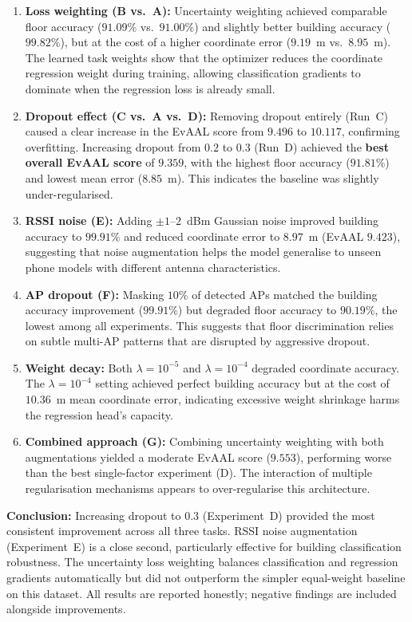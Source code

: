 \begin{enumerate}
    \item \textbf{Loss weighting (B vs.\ A):} Uncertainty weighting achieved comparable floor accuracy ($91.09\%$ vs.\ $91.00\%$) and slightly better building accuracy ($99.82\%$), but at the cost of a higher coordinate error ($9.19$~m vs.\ $8.95$~m). The learned task weights show that the optimizer reduces the coordinate regression weight during training, allowing classification gradients to dominate when the regression loss is already small.
    \item \textbf{Dropout effect (C vs.\ A vs.\ D):} Removing dropout entirely (Run~C) caused a clear increase in the EvAAL score from $9.496$ to $10.117$, confirming overfitting. Increasing dropout from $0.2$ to $0.3$ (Run~D) achieved the \textbf{best overall EvAAL score} of $9.359$, with the highest floor accuracy ($91.81\%$) and lowest mean error ($8.85$~m). This indicates the baseline was slightly under-regularised.
    \item \textbf{RSSI noise (E):} Adding $\pm 1$--$2$~dBm Gaussian noise improved building accuracy to $99.91\%$ and reduced coordinate error to $8.97$~m (EvAAL $9.423$), suggesting that noise augmentation helps the model generalise to unseen phone models with different antenna characteristics.
    \item \textbf{AP dropout (F):} Masking $10\%$ of detected APs matched the building accuracy improvement ($99.91\%$) but degraded floor accuracy to $90.19\%$, the lowest among all experiments. This suggests that floor discrimination relies on subtle multi-AP patterns that are disrupted by aggressive dropout.
    \item \textbf{Weight decay:} Both $\lambda = 10^{-5}$ and $\lambda = 10^{-4}$ degraded coordinate accuracy. The $\lambda = 10^{-4}$ setting achieved perfect building accuracy but at the cost of $10.36$~m mean coordinate error, indicating excessive weight shrinkage harms the regression head's capacity.
    \item \textbf{Combined approach (G):} Combining uncertainty weighting with both augmentations yielded a moderate EvAAL score ($9.553$), performing worse than the best single-factor experiment (D). The interaction of multiple regularisation mechanisms appears to over-regularise this architecture.
\end{enumerate}

\textbf{Conclusion:} Increasing dropout to $0.3$ (Experiment~D) provided the most consistent improvement across all three tasks. RSSI noise augmentation (Experiment~E) is a close second, particularly effective for building classification robustness. The uncertainty loss weighting balances classification and regression gradients automatically but did not outperform the simpler equal-weight baseline on this dataset. All results are reported honestly; negative findings are included alongside improvements.
